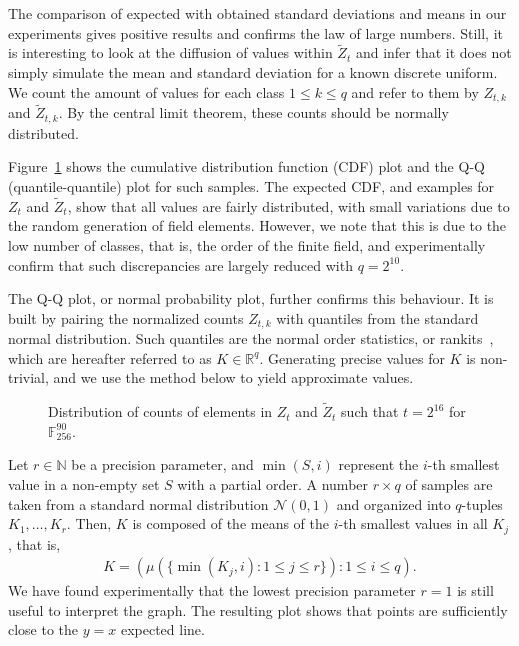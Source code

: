 \documentclass[12pt, a4paper, oneside]{memoir}
\theoremstyle{definition}
\begin{document}
The comparison of expected with obtained standard deviations and means in our experiments gives positive results and confirms the law of large numbers. Still, it is interesting to look at the diffusion of values within $\widetilde{Z}_{t}$ and infer that it does not simply simulate the mean and standard deviation for a known discrete uniform. We count the amount of values for each class $1 \leq k \leq q$ and refer to them by $Z_{t, k}$ and $\widetilde{Z}_{t, k}$. By the central limit theorem, these counts should be normally distributed.

Figure~\ref{fig:dist-plot} shows the cumulative distribution function (CDF) plot and the Q-Q (quantile-quantile) plot for such samples. The expected CDF, and examples for $Z_{t}$ and $\widetilde{Z}_{t}$, show that all values are fairly distributed, with small variations due to the random generation of field elements. However, we note that this is due to the low number of classes, that is, the order of the finite field, and experimentally confirm that such discrepancies are largely reduced with $q = 2^{10}$.

The Q-Q plot, or normal probability plot, further confirms this behaviour. It is built by pairing the normalized counts $Z_{t, k}$ with quantiles from the standard normal distribution. Such quantiles are the normal order statistics, or rankits~\cite[p.~349]{Ipsen:194405}, which are hereafter referred to as $K \in \mathbb{R}^{q}$. Generating precise values for $K$ is non-trivial, and we use the method below to yield approximate values.

\begin{figure}[htbp]
  \caption{Distribution of counts of elements in $Z_{t}$ and
    $\widetilde{Z}_{t}$ such that $t = 2^{16}$ for
    $\mathbb{F}_{256}^{90}$.}\label{fig:dist-plot}
\end{figure}

Let $r \in \mathbb{N}$ be a precision parameter, and $\min(S, i)$ represent the $i$-th smallest value in a non-empty set $S$ with a partial order. A number $r \times q$ of samples are taken from a standard normal distribution $\mathcal{N}(0, 1)$ and organized into $q$-tuples $K_{1}, \dots, K_{r}$. Then, $K$ is composed of the means of the $i$-th smallest values in all $K_{j}$, that is,
\begin{align}
  K = \left( \mu(\{\min(K_{j}, i) : 1 \leq j \leq r\}) : 1 \leq i \leq q \right).
\end{align}
We have found experimentally that the lowest precision parameter $r = 1$ is still useful to interpret the graph. The resulting plot shows that points are sufficiently close to the $y = x$ expected line.
\end{document}
